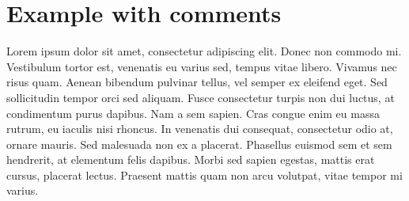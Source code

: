 \documentclass[11pt, a4paper, draft]{article}
\begin{document}
\section{Example with comments}
Lorem ipsum dolor sit amet, consectetur adipiscing elit.
Donec non commodo mi.
Vestibulum tortor est, venenatis eu varius sed, tempus vitae libero.
Vivamus nec risus quam. %
Aenean bibendum pulvinar tellus, vel semper ex eleifend eget.
Sed sollicitudin tempor orci sed aliquam.
Fusce consectetur turpis non dui luctus, at condimentum purus dapibus.
Nam a sem sapien.
Cras congue enim eu massa rutrum, eu iaculis nisi rhoncus.
In venenatis dui consequat, consectetur odio at, ornare mauris.
Sed malesuada non ex a placerat.
Phasellus euismod sem et sem hendrerit, at elementum felis dapibus.
Morbi sed sapien egestas, mattis erat cursus, placerat lectus.
Praesent mattis quam non arcu volutpat, vitae tempor mi varius.
\end{document}
